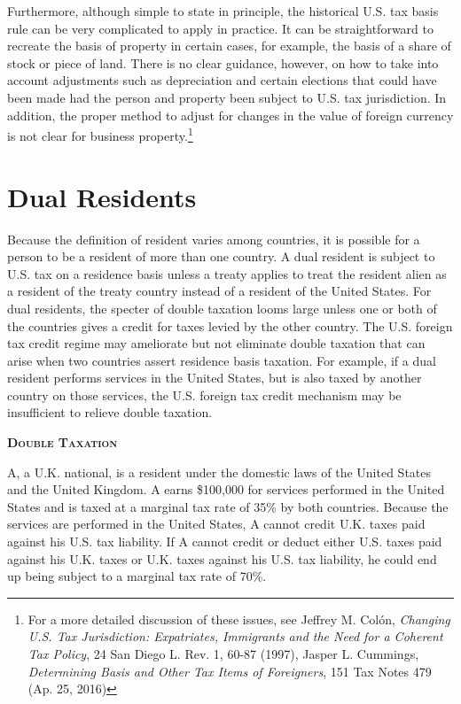 \begin{enumerate}
Furthermore, although simple to state in principle, the historical U.S. tax basis rule can be very complicated to apply in practice.  It can be straightforward to recreate the basis of property in certain cases, for example, the basis of a share of stock or piece of land.  There is no clear guidance, however, on how to take into account adjustments such as depreciation and certain elections that could have been made had the person and property been subject to U.S. tax jurisdiction.  In addition, the proper method to adjust for changes in the value of foreign currency is not clear for business property.\footnote{For a more detailed discussion of these issues, see Jeffrey M. Col\'on, \textit{Changing U.S. Tax Jurisdiction:  Expatriates, Immigrants and the Need for a Coherent Tax Policy}, 24 San Diego L. Rev. 1, 60-87 (1997), Jasper L. Cummings, \textit{Determining Basis and Other Tax Items of Foreigners}, 151 Tax Notes 479 (Ap. 25, 2016) }

 
\end{enumerate}

\section{Dual Residents}
Because the definition of resident varies among countries, it is possible for a person to be a resident of more than one country.  A dual resident is subject to U.S. tax on a residence basis unless a treaty applies to treat the resident alien as a resident of the treaty country instead of a resident of the United States.  For dual residents, the specter of double taxation looms large unless one or both of the countries gives a credit for taxes levied by the other country.  The U.S. foreign tax credit regime may ameliorate but not eliminate double taxation that can arise when two countries assert residence basis taxation.  For example, if a dual resident performs services in the United States, but is also taxed by another country on those services, the U.S. foreign tax credit mechanism may be insufficient to relieve double taxation.   

	\begin{framed}
		\begin{center}
			\textbf{\textsc{Double Taxation}}
		\end{center}
A, a U.K. national, is a resident under the domestic laws of the United States and the United Kingdom.  A earns \$100,000 for services performed in the United States and is taxed at a marginal tax rate of 35\% by both countries.  Because the services are performed in the United States, A cannot credit U.K. taxes paid against his U.S. tax liability.  If A cannot credit or deduct either U.S. taxes paid against his U.K. taxes or U.K. taxes against his U.S. tax liability, he could end up being subject to a marginal tax rate of 70\%.
		\end{framed}


